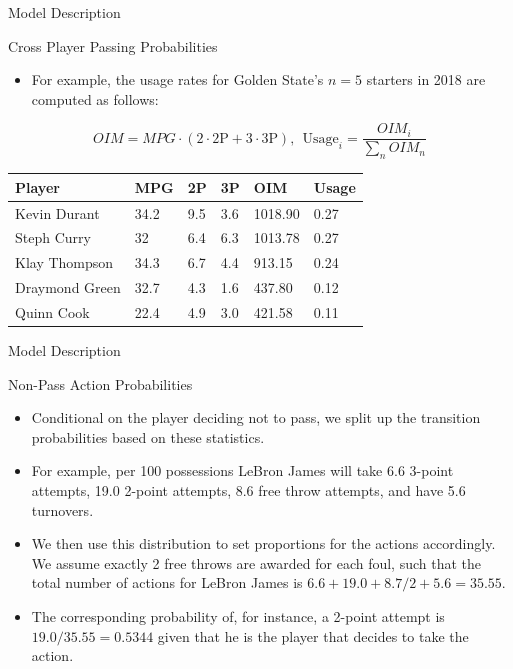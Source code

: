 \documentclass{beamer}
\begin{document}
\begin{frame}{Model Description}
\begin{block}{Cross Player Passing Probabilities}
\begin{itemize}
    \item For example, the usage rates for Golden State’s $n= 5$ starters in 2018 are computed as follows:
\end{itemize}

$$ OIM = MPG \cdot (2\cdot2\mbox{P}+3\cdot3\mbox{P}),\ \ \text{Usage}_i = \frac{OIM_i}{\sum_{n} OIM_n}  $$

\vspace{-3mm}

\begin{table}[H]
\centering
\begin{tabular}{|l|l|l|l|l|l|} 
\hline
Player          & MPG & 2P   & 3P  & OIM     & Usage  \\ 
\hline
Kevin Durant    & 34.2                    &  9.5 & 3.6 & 1018.90 & 0.27   \\ 
\hline
Steph Curry      & 32                      & 6.4  & 6.3 & 1013.78  & 0.27   \\ 
\hline
Klay Thompson   & 34.3                    &  6.7  & 4.4 & 913.15  & 0.24   \\ 
\hline
Draymond Green & 32.7                   & 4.3  & 1.6 & 437.80  & 0.12   \\ 
\hline
Quinn Cook     & 22.4                    & 4.9  & 3.0 & 421.58  & 0.11   \\
\hline
\end{tabular}
\end{table}
\end{block}
\end{frame}


\begin{frame}{Model Description}
\begin{block}{Non-Pass Action Probabilities}
\begin{itemize}
    \item Conditional on the player deciding not to pass, we split up the transition probabilities based on these statistics.
    \item For example, per 100 possessions LeBron James will take 6.6 3-point attempts, 19.0 2-point attempts, 8.6 free throw attempts, and have 5.6 turnovers.
    \item We then use this distribution to set proportions for the actions accordingly. We assume exactly 2 free throws are awarded for each foul, such that the total number of actions for LeBron James is $6.6+19.0+8.7/2+5.6=35.55$.
    \item The corresponding probability of, for instance, a 2-point attempt is $19.0/35.55=0.5344$ given that he is the player that decides to take the action.
\end{itemize}
\end{block}
\end{frame}
\end{document}
